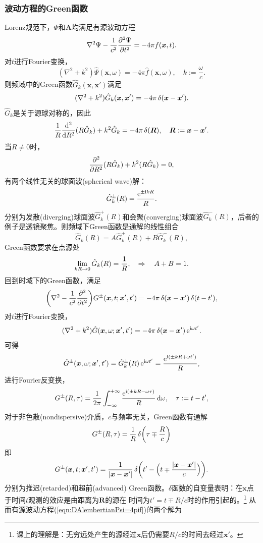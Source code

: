 \subsubsection{波动方程的Green函数}
Lorenz规范下，$\Phi$和$\bm A$均满足有源波动方程
\begin{equation}
    \label{eqn:DAlembertianPsi=4pif}
    \lapla\Psi-\frac1{c^2}\pv[2]\Psi t=-4\pi f(\bm x,t).
\end{equation}
对$t$进行Fourier变换，%
\[
    (\nabla^2+k^2)\hat\Psi(\bm x,\omega)=-4\pi\hat f(\bm x,\omega),\quad k:=\frac\omega c.
\]
则频域中的Green函数$\hat G_k(\bm x,\bm x')$满足
\[
    (\nabla^2+k^2)\hat G_k(\bm x,\bm x')=-4\pi\vd(\bm x-\bm x').
\]
$\hat G_k$是关于源球对称的，因此
\[
    \frac1R\dd[2]R(R\hat G_k)+k^2\hat G_k=-4\pi\vd(\bm R),\quad\bm R:=\bm x-\bm x'.
\]
当$R\neq 0$时， 
\[
    \pp[2]R(R\hat G_k)+k^2(R\hat G_k)=0,%
\]
有两个线性无关的球面波(spherical wave)解：
\[
    \hat G_k^\pm(R)=\frac{\e{\pm\i kR}}R.
\]
分别为发散(diverging)球面波$\hat G_k^+(R)$和会聚(converging)球面波$\hat G_k^-(R)$，后者的例子是透镜聚焦。则频域下Green函数是通解的线性组合
\[
    \hat G_k(R)=A\hat G_k^+(R)+B\hat G_k^-(R),
\]
Green函数要求在点源处
\[
    \lim_{kR\to0}\hat G_k(R)=\frac1R,\thus A+B=1.
\]
回到时域下的Green函数，满足
\[
    \biggkh{\lapla-\frac1{c^2}\pp[2]t}G^\pm(\bm x,t;\bm x',t')=-4\pi\vd(\bm x-\bm x')\vd(t-t'),
\]
对$t$进行Fourier变换， 
\[
    (\lapla+k^2)\hat G(\bm x,\omega;\bm x',t')=-4\pi\vd(\bm x-\bm x')\e{\i\omega t'}.
\]
可得 
\[
    \hat G^\pm(\bm x,\omega;\bm x',t')=\hat G_k^\pm(R)\e{\i\omega t'}=\frac{\e{\i(\pm kR+\omega t')}}R,
\]
进行Fourier反变换，
\[
    G^\pm(R,\tau)=\frac1{2\pi}\int\iti\frac{\e{\i(\pm kR-\omega\tau)}}R\d\omega,\quad\tau:=t-t',
\]
对于非色散(nondispersive)介质，$c$与频率无关，Green函数有通解
\[
    G^\pm(R,\tau)=\frac1R\vd\biggkh{\tau\mp\frac Rc}
\]
即
\begin{equation}
    G^\pm(\bm x,t;\bm x',t')=\frac1{|\bm x-\bm x'|}\vd\biggkh{t'-\Bigkh{t\mp\frac{|\bm x-\bm x'|}c}}.
\end{equation}
分别为推迟(retarded)和超前(advanced) Green函数。$\delta$函数的自变量表明：在$\bm x$点于时间$t$观测的效应是由距离为$\bm R$的源在%
时间为$t'=t\mp R/c$时的作用引起的。\footnote{课上的理解是：无穷远处产生的源经过$\bm x$后仍需要$R/c$的时间去经过$\bm x'$。}
从而有源波动方程(\ref{eqn:DAlembertianPsi=4pif})的两个解为 
